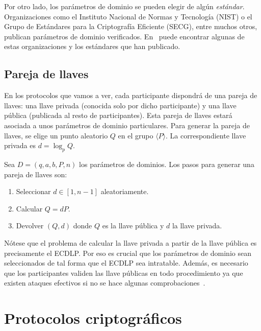 Por otro lado, los parámetros de dominio se pueden elegir de algún \emph{estándar}. Organizaciones como el Instituto Nacional de Normas y Tecnología (NIST) o el Grupo de Estándares para la Criptografía Eficiente (SECG), entre muchos otros, publican
parámetros de dominio verificados. En~\cite[apéndice B]{Hankerson:2003} puede encontrar algunas de estas organizaciones y los estándares que han publicado.

\subsection{Pareja de llaves}
\label{sub:Pareja de llaves}

En los protocolos que vamos a ver, cada participante dispondrá de una pareja de llaves: una llave privada (conocida solo por dicho participante) y una llave pública (publicada al resto de participantes). Esta pareja de llaves estará asociada a unos parámetros de dominio particulares. Para generar la pareja de llaves, se elige un punto aleatorio $Q$ en el grupo $\langle P \rangle$. La correspondiente llave privada es $d = \log_p Q$.

\begin{algoritmo}\label{alg:pareja de llaves}
    Sea $D = (q, a, b, P, n)$ los parámetros de dominios. Los pasos para generar una pareja de llaves son:
    \begin{enumerate}
        \item Seleccionar $d \in [1, n -1]$ aleatoriamente.
        \item Calcular $Q = d P$.
        \item Devolver $(Q, d)$ donde $Q$ es la llave pública y $d$ la llave privada.
    \end{enumerate}
\end{algoritmo}

Nótese que el problema de calcular la llave privada a partir de la llave pública es precisamente el ECDLP. Por eso es crucial que los parámetros de dominio sean seleccionados de tal forma que el ECDLP sea intratable. Además, es necesario que los participantes validen las llave públicas en todo procedimiento ya que existen ataques efectivos si no se hace algunas comprobaciones~\cite[cap. 4]{Hankerson:2003}.

\section{Protocolos criptográficos}
\label{sec:Protocolos criptográficos}

